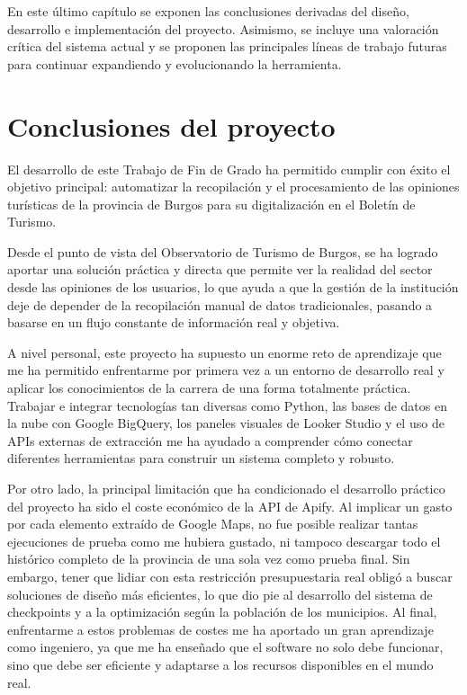 En este último capítulo se exponen las conclusiones derivadas del diseño, desarrollo e implementación del proyecto. Asimismo, se incluye una valoración crítica del sistema actual y se proponen las principales líneas de trabajo futuras para continuar expandiendo y evolucionando la herramienta.

\section{Conclusiones del proyecto}
El desarrollo de este Trabajo de Fin de Grado ha permitido cumplir con éxito el objetivo principal: automatizar la recopilación y el procesamiento de las opiniones turísticas de la provincia de Burgos para su digitalización en el Boletín de Turismo. 

Desde el punto de vista del Observatorio de Turismo de Burgos, se ha logrado aportar una solución práctica y directa que permite ver la realidad del sector desde las opiniones de los usuarios, lo que ayuda a que la gestión de la institución deje de depender de la recopilación manual de datos tradicionales, pasando a basarse en un flujo constante de información real y objetiva.

A nivel personal, este proyecto ha supuesto un enorme reto de aprendizaje que me ha permitido enfrentarme por primera vez a un entorno de desarrollo real y aplicar los conocimientos de la carrera de una forma totalmente práctica. Trabajar e integrar tecnologías tan diversas como Python, las bases de datos en la nube con Google BigQuery, los paneles visuales de Looker Studio y el uso de APIs externas de extracción me ha ayudado a comprender cómo conectar diferentes herramientas para construir un sistema completo y robusto. 

Por otro lado, la principal limitación que ha condicionado el desarrollo práctico del proyecto ha sido el coste económico de la API de Apify. Al implicar un gasto por cada elemento extraído de Google Maps, no fue posible realizar tantas ejecuciones de prueba como me hubiera gustado, ni tampoco descargar todo el histórico completo de la provincia de una sola vez como prueba final. Sin embargo, tener que lidiar con esta restricción presupuestaria real obligó a buscar soluciones de diseño más eficientes, lo que dio pie al desarrollo del sistema de checkpoints y a la optimización según la población de los municipios. Al final, enfrentarme a estos problemas de costes me ha aportado un gran aprendizaje como ingeniero, ya que me ha enseñado que el software no solo debe funcionar, sino que debe ser eficiente y adaptarse a los recursos disponibles en el mundo real.


